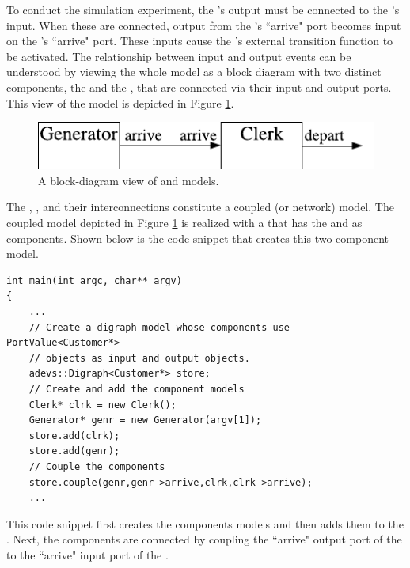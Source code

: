To conduct the simulation experiment, the 's output must be connected to the 's input.  When these are connected, output from the 's ``arrive" port becomes input on the 's ``arrive" port. These inputs cause the 's external transition function to be activated. The relationship between input and output events can be understood by viewing the whole model as a block diagram with two distinct components, the  and the , that are connected via their input and output ports. This view of the model is depicted in Figure \ref{fig:clerk_and_generator}.
\begin{figure}[ht]
\centering
\includegraphics{intro_figs/generator_and_clerk.pdf}
\caption{A block-diagram view of  and  models.}
\label{fig:clerk_and_generator}
\end{figure}

The , , and their interconnections constitute a coupled (or network) model. The coupled model depicted in Figure \ref{fig:clerk_and_generator} is realized with a  that has the  and  as components. Shown below is the code snippet that creates this two component model.
\begin{verbatim}
int main(int argc, char** argv)
{
    ...
    // Create a digraph model whose components use PortValue<Customer*>
    // objects as input and output objects.
    adevs::Digraph<Customer*> store;
    // Create and add the component models
    Clerk* clrk = new Clerk();
    Generator* genr = new Generator(argv[1]); 
    store.add(clrk);
    store.add(genr);
    // Couple the components
    store.couple(genr,genr->arrive,clrk,clrk->arrive);
    ...
\end{verbatim}
This code snippet first creates the components models and then adds them to the . Next, the components are connected by coupling the ``arrive" output port of the  to the ``arrive" input port of the .

